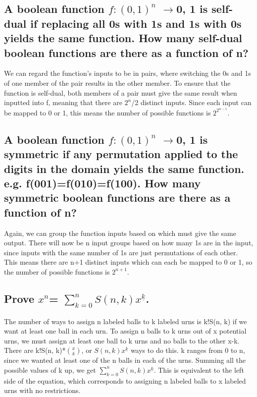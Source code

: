
\subsection{A boolean function $ f: {(0, 1)}^n $  $\rightarrow $0, 1 is self-dual if replacing all 0s with 1s and 1s with 0s yields the same function. How many self-dual boolean functions are there as a function of n?}
We can regard the function's inputs to be in pairs, where switching the 0s and 1s of one member of the pair results in the other member. To ensure that the function is self-dual, both members of a pair must give the same result when inputted into f, meaning that there are $2^n$/2 distinct inputs. Since each input can be mapped to 0 or 1, this means the number of possible functions is $2^{2^{n-1}}$.


\subsection{A boolean function $ f: {(0, 1)}^n $  $\rightarrow $0, 1 is symmetric if any permutation applied to the digits in the domain yields the same function. e.g. f(001)=f(010)=f(100). How many symmetric boolean functions are there as a function of n?}
Again, we can group the function inputs based on which must give the same output. There will now be n input groups based on how many 1s are in the input, since inputs with the same number of 1s are just permutations of each other. This means there are n+1 distinct inputs which can each be mapped to 0 or 1, so the number of possible functions is $2^{n+1}$.


\subsection{Prove $x^n$= $\sum_{k=0}^{n} {S(n, k)x^{\underline{k}}}$.}

The number of ways to assign n labeled balls to k labeled urns is k!S(n, k) if we want at least one ball in each urn. To assign n balls to k urns out of x potential urns, we must assign at least one ball to k urns and no balls to the other x-k. There are k!S(n, k)*$\binom x k$, or $S(n, k)x^{\underline{k}}$ ways to do this. k ranges from 0 to n, since we wanted at least one of the n balls in each of the urns. Summing all the possible values of k up, we get $\sum_{k=0}^{n} {S(n, k)x^{\underline{k}}}$. This is equivalent to the left side of the equation, which corresponds to assigning n labeled balls to x labeled urns with no restrictions. 

